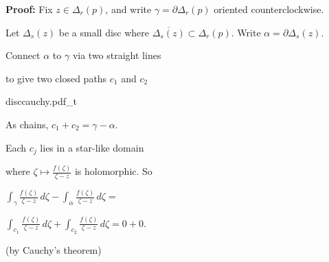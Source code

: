 \documentclass[10pt,aspectratio=169]{beamer}
\begin{document}
\begin{frame}
\textbf{Proof:}
Fix $z \in \Delta_r(p)$, and write $\gamma = \partial \Delta_r(p)$ oriented counterclockwise.

\medskip
\pause

Let $\Delta_s(z)$ be a small disc where $\overline{\Delta_s(z)} \subset
\Delta_r(p)$.
\pause
Write $\alpha = \partial \Delta_s(z)$.

\pause
\medskip

Connect $\alpha$ to $\gamma$
via two straight lines

to give two closed paths
$c_1$ and $c_2$

\vspace*{-0.35in}
\hspace*{2.6in}%
{disccauchy.pdf_t}

\pause
\vspace*{-1.8in}

As chains, $c_1+c_2 = \gamma - \alpha$.

\medskip
\pause

Each $c_j$ lies in a star-like domain

where $\displaystyle \zeta \mapsto \frac{f(\zeta)}{\zeta-z}$ is holomorphic.
\pause
So

\medskip

$
\displaystyle
\int_{\gamma} \frac{f(\zeta)}{\zeta-z} \, d\zeta -
\int_{\alpha} \frac{f(\zeta)}{\zeta-z} \, d\zeta =
$
\medskip

\hspace*{0.6in}
$
\displaystyle
\int_{c_1} \frac{f(\zeta)}{\zeta-z} \, d\zeta + 
\int_{c_2} \frac{f(\zeta)}{\zeta-z} \, d\zeta = 0 + 0 .
$

\medskip

\hspace*{1.4in}
(by Cauchy's theorem)


\end{frame}
\end{document}
